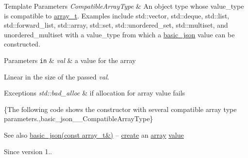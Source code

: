 \begin{DoxyTemplParams}{Template Parameters}
{\em Compatible\+Array\+Type} & An object type whose {\ttfamily value\+\_\+type} is compatible to \hyperlink{classnlohmann_1_1basic__json_ab00b882d39306d663c23dab110f5cae0}{array\+\_\+t}. Examples include {\ttfamily std\+::vector}, {\ttfamily std\+::deque}, {\ttfamily std\+::list}, {\ttfamily std\+::forward\+\_\+list}, {\ttfamily std\+::array}, {\ttfamily std\+::set}, {\ttfamily std\+::unordered\+\_\+set}, {\ttfamily std\+::multiset}, and {\ttfamily unordered\+\_\+multiset} with a {\ttfamily value\+\_\+type} from which a \hyperlink{classnlohmann_1_1basic__json}{basic\+\_\+json} value can be constructed.\\
\hline
\end{DoxyTemplParams}

\begin{DoxyParams}[1]{Parameters}
\mbox{\tt in}  & {\em val} & a value for the array\\
\hline
\end{DoxyParams}
Linear in the size of the passed {\itshape val}.


\begin{DoxyExceptions}{Exceptions}
{\em std\+::bad\+\_\+alloc} & if allocation for array value fails\\
\hline
\end{DoxyExceptions}
\{The following code shows the constructor with several compatible array type parameters.,basic\+\_\+json\+\_\+\+\_\+\+Compatible\+Array\+Type\}

\begin{DoxySeeAlso}{See also}
\hyperlink{classnlohmann_1_1basic__json_a3aaf41d385f0d9a93deb92f9b14ae0cf}{basic\+\_\+json(const array\+\_\+t\&)} -- \hyperlink{classnlohmann_1_1basic__json_afdb7a485369fbfd8c4c7c134ebb1feb5}{create} an \hyperlink{classnlohmann_1_1basic__json_a5685815624b086caa532f41e853d4b0f}{array} \hyperlink{classnlohmann_1_1basic__json_a407e73a037e6e3067ef7aa2c25a79f39}{value}
\end{DoxySeeAlso}
\begin{DoxySince}{Since}
version 1.. 
\end{DoxySince}
\hypertarget{classnlohmann_1_1basic__json_ab8b43d92a042dde96c28aeea81dd52de}{}\label{classnlohmann_1_1basic__json_ab8b43d92a042dde96c28aeea81dd52de} 
